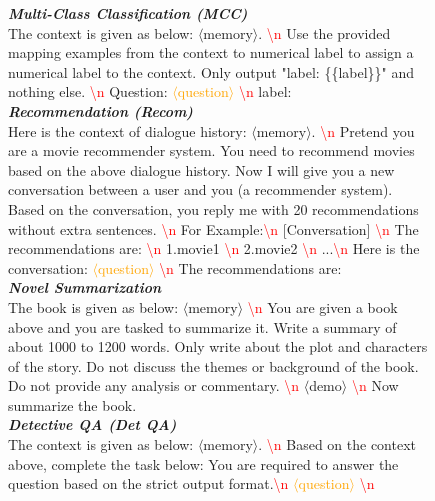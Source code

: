 \begin{figure}[h!]
{\begin{tcolorbox}[colback=gray!5!white, colframe=blue!75!black, 
title=Examples of Prompts Used for Task Execution on Various Dataset, boxrule=0.3mm, width=1.2\textwidth, arc=3mm, auto outer arc=true]
\emph{\textbf{Multi-Class Classification (MCC)}} \\ 
The context is given as below: \textcolor{deepblue}{$\langle$memory$\rangle$}. \textcolor{red}{\textbackslash n} Use the provided mapping examples from the context to numerical label to assign a numerical label to the context. Only output "label: \{\{label\}\}" and nothing else. \textcolor{red}{\textbackslash n} Question:  \textcolor{orange}{$\langle$question$\rangle$} \textcolor{red}{\textbackslash n} label: \\ 


\emph{\textbf{Recommendation (Recom)}} \\ 
Here is the context of dialogue history: \textcolor{deepblue}{$\langle$memory$\rangle$}. \textcolor{red}{\textbackslash n} Pretend you are a movie recommender system. You need to recommend movies based on the above dialogue history. Now I will give you a new conversation between a user and you (a recommender system). Based on the conversation, you reply me with 20 recommendations without extra sentences. \textcolor{red}{\textbackslash n} For Example:\textcolor{red}{\textbackslash n} [Conversation] \textcolor{red}{\textbackslash n} The recommendations are: \textcolor{red}{\textbackslash n} 1.movie1 \textcolor{red}{\textbackslash n} 2.movie2 \textcolor{red}{\textbackslash n} ...\textcolor{red}{\textbackslash n} Here is the conversation: \textcolor{orange}{$\langle$question$\rangle$} \textcolor{red}{\textbackslash n} The recommendations are: \\ 


\emph{\textbf{Novel Summarization}} \\ 
The book is given as below: \textcolor{deepblue}{$\langle$memory$\rangle$} \textcolor{red}{\textbackslash n} You are given a book above and you are tasked to summarize it. Write a summary of about 1000 to 1200 words. Only write about the plot and characters of the story. Do not discuss the themes or background of the book. Do not provide any analysis or commentary. \textcolor{red}{\textbackslash n} \textcolor{midnightgreen}{$\langle$demo$\rangle$} \textcolor{red}{\textbackslash n} Now summarize the book.  \\ 


\emph{\textbf{Detective QA (Det QA)}} \\ 
The context is given as below: \textcolor{deepblue}{$\langle$memory$\rangle$}. \textcolor{red}{\textbackslash n}  Based on the context above, complete the task below: You are required to answer the question based on the strict output format.\textcolor{red}{\textbackslash n}  \textcolor{orange}{$\langle$question$\rangle$} \textcolor{red}{\textbackslash n}   \\ 



\end{tcolorbox}}
\end{figure}
